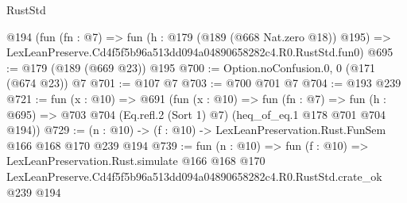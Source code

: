 \begin{lexlean}{RustStd}
\begin{coremodule}
    @194
    (fun (fn : @7) =>
    fun (h : @179 (@189 (@668 Nat.zero @18)) @195) =>
    LexLeanPreserve.Cd4f5f5b96a513dd094a04890658282c4.R0.RustStd.fun0)
@695 := @179 (@189 (@669 @23)) @195
@700 := Option.noConfusion.{0, 0} (@171 (@674 @23)) @7
@701 := @107 @7
@703 := @700 @701 @7
@704 := @193 @239
@721 := fun (x : @10) =>
  @691
    (fun (x : @10) =>
    fun (fn : @7) =>
    fun (h : @695) => @703 @704 (Eq.refl.{2} (Sort 1) @7) (heq_of_eq.{1} @178 @701 @704 @194))
@729 := (n : @10) -> (f : @10) -> LexLeanPreservation.Rust.FunSem @166 @168 @170 @239 @194
@739 := fun (n : @10) =>
  fun (f : @10) =>
  LexLeanPreservation.Rust.simulate
    @166
    @168
    @170
    LexLeanPreserve.Cd4f5f5b96a513dd094a04890658282c4.R0.RustStd.crate_ok
    @239
    @194
\end{coremodule}
\end{lexlean}
